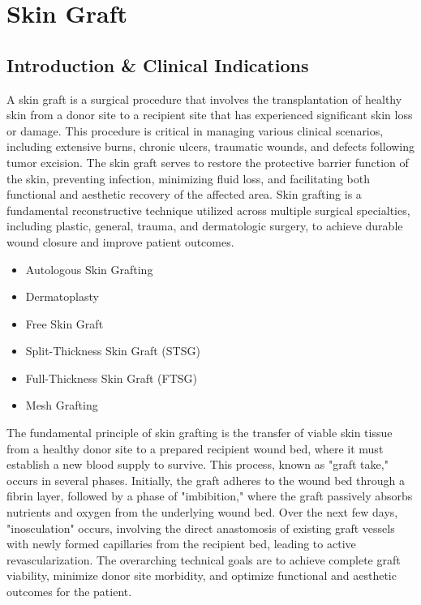 \chapter{Skin Graft}

\section*{Introduction \& Clinical Indications}
A skin graft is a surgical procedure that involves the transplantation of healthy skin from a donor site to a recipient site that has experienced significant skin loss or damage. This procedure is critical in managing various clinical scenarios, including extensive burns, chronic ulcers, traumatic wounds, and defects following tumor excision. The skin graft serves to restore the protective barrier function of the skin, preventing infection, minimizing fluid loss, and facilitating both functional and aesthetic recovery of the affected area. Skin grafting is a fundamental reconstructive technique utilized across multiple surgical specialties, including plastic, general, trauma, and dermatologic surgery, to achieve durable wound closure and improve patient outcomes.

\begin{itemize}
  \item Autologous Skin Grafting
  \item Dermatoplasty
  \item Free Skin Graft
  \item Split-Thickness Skin Graft (STSG)
  \item Full-Thickness Skin Graft (FTSG)
  \item Mesh Grafting
\end{itemize}

The fundamental principle of skin grafting is the transfer of viable skin tissue from a healthy donor site to a prepared recipient wound bed, where it must establish a new blood supply to survive. This process, known as "graft take," occurs in several phases. Initially, the graft adheres to the wound bed through a fibrin layer, followed by a phase of "imbibition," where the graft passively absorbs nutrients and oxygen from the underlying wound bed. Over the next few days, "inosculation" occurs, involving the direct anastomosis of existing graft vessels with newly formed capillaries from the recipient bed, leading to active revascularization. The overarching technical goals are to achieve complete graft viability, minimize donor site morbidity, and optimize functional and aesthetic outcomes for the patient.

